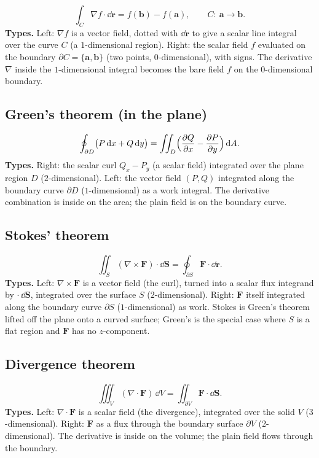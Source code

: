\documentclass{essay}
\newcommand{\F}{\mathbf{F}}
\begin{document}
\[
\int_C \nabla f\cdot\dd\mathbf{r} = f(\mathbf{b}) - f(\mathbf{a}),
\qquad C:\ \mathbf{a}\to\mathbf{b}.
\]
\textbf{Types.} Left: $\nabla f$ is a vector field, dotted with $\dd\mathbf{r}$ to
give a scalar line integral over the curve $C$ (a $1$-dimensional region). Right: the
scalar field $f$ evaluated on the boundary $\partial C=\{\mathbf{a},\mathbf{b}\}$
(two points, $0$-dimensional), with signs. The derivative $\nabla$ inside the
$1$-dimensional integral becomes the bare field $f$ on the $0$-dimensional boundary.

\subsection{Green's theorem (in the plane)}

\[
\oint_{\partial D} \bigl(P\,\mathrm{d} x + Q\,\mathrm{d} y\bigr)
= \iint_D \Bigl(\frac{\partial Q}{\partial x} - \frac{\partial P}{\partial y}\Bigr)\,\mathrm{d} A .
\]
\textbf{Types.} Right: the scalar curl $Q_x-P_y$ (a scalar field) integrated over the
plane region $D$ ($2$-dimensional). Left: the vector field $(P,Q)$ integrated along
the boundary curve $\partial D$ ($1$-dimensional) as a work integral. The derivative
combination is inside on the area; the plain field is on the boundary curve.

\subsection{Stokes' theorem}

\[
\iint_S (\nabla\times\F)\cdot\dd\mathbf{S}
= \oint_{\partial S} \F\cdot\dd\mathbf{r}.
\]
\textbf{Types.} Left: $\nabla\times\F$ is a vector field (the curl), turned into a
scalar flux integrand by $\cdot\,\dd\mathbf{S}$, integrated over the surface $S$
($2$-dimensional). Right: $\F$ itself integrated along the boundary curve
$\partial S$ ($1$-dimensional) as work. Stokes is Green's theorem lifted off the
plane onto a curved surface; Green's is the special case where $S$ is a flat region
and $\F$ has no $z$-component.

\subsection{Divergence theorem}

\[
\iiint_V (\nabla\cdot\F)\,\dd V
= \iint_{\partial V} \F\cdot\dd\mathbf{S}.
\]
\textbf{Types.} Left: $\nabla\cdot\F$ is a scalar field (the divergence), integrated
over the solid $V$ ($3$-dimensional). Right: $\F$ as a flux through the boundary
surface $\partial V$ ($2$-dimensional). The derivative is inside on the volume; the
plain field flows through the boundary.
\end{document}
